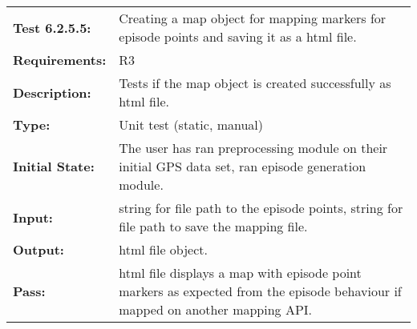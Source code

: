 \documentclass[12pt, titlepage]{article}
\begin{document}
{\begin{tabular}{|l|p{10cm}|}
    \hline
    \bf{Test} 6.2.5.5: & Creating a map object for mapping markers for episode points and saving it as a html file.\\
    \bf{Requirements}: &  R3\\
    \bf{Description}: & Tests if the map object is created successfully as html file. \\
    \bf{Type}: & Unit test (static, manual) \\
    \bf{Initial State}: & The user has ran preprocessing module on their initial GPS data set, ran episode generation module. \\
    \bf{Input}: & string for file path to the episode points, string for file path to save the mapping file. \\
    \bf{Output}: & html file object. \\
    \bf{Pass}: & html file displays a map with episode point markers as expected from the episode behaviour if mapped on another mapping API. \\
    \hline
\end{tabular}}
\end{document}
